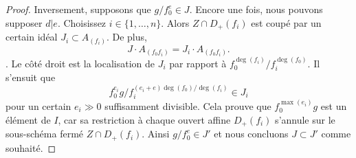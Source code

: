 \begin{proof}
\medskip\noindent
Inversement, supposons que  $g/f_0^e \in J$. Encore une fois, nous pouvons supposer
 $d | e$. Choisissez  $i \in \{1, \ldots, n\}$. Alors  $Z \cap D_{+}(f_i)$  est coupé par un certain
idéal  $J_i \subset A_{(f_i)}$. De plus,
$$
J \cdot A_{(f_0f_i)} = J_i \cdot A_{(f_0f_i)}.
$$
. Le côté droit est la localisation de  $J_i$  par rapport à  $f_0^{\deg(f_i)}/f_i^{\deg(f_0)}$. Il
s'ensuit que
$$
f_0^{e_i}g/f_i^{(e_i + e)\deg(f_0)/\deg(f_i)} \in J_i
$$
pour un certain  $e_i \gg 0$  suffisamment divisible. Cela prouve que  $f_0^{\max(e_i)}g$ 
est un élément de  $I$, car sa restriction à chaque ouvert affine
 $D_{+}(f_i)$  s'annule sur le sous-schéma fermé  $Z \cap D_{+}(f_i)$. Ainsi  $g/f_0^e \in J'$  et
nous concluons  $J \subset J'$  comme souhaité.
\end{proof}

